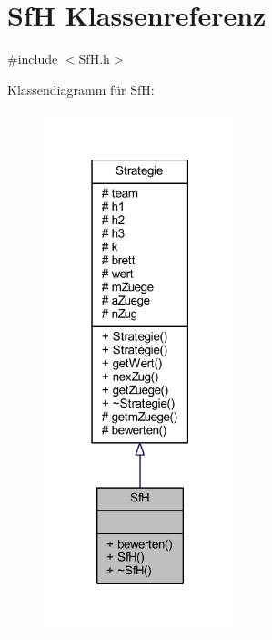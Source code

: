 \hypertarget{class_sf_h}{}\section{Sf\+H Klassenreferenz}
\label{class_sf_h}


{\ttfamily \#include $<$Sf\+H.\+h$>$}



Klassendiagramm für Sf\+H\+:\nopagebreak
\begin{figure}[H]
\begin{center}
\leavevmode
\includegraphics[width=159pt]{class_sf_h__inherit__graph}
\end{center}
\end{figure}


